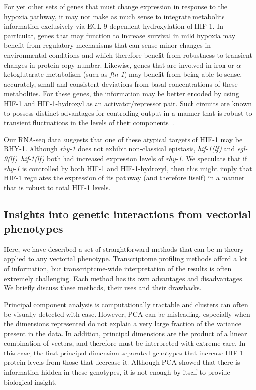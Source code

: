 \documentclass[10pt, onecolumn]{article}
\newcommand{\gene}[1]{\emph{#1}}
\newcommand{\ftna}{\emph{\mbox{ftn-1}}}
\newcommand{\eglhif}{\emph{\mbox{egl-9(lf)}~\mbox{hif-1(lf)}}}
\newcommand{\hif}{\emph{\mbox{hif-1(lf)}}}
\newcommand{\eglp}{EGL-9}
\newcommand{\rhyp}{RHY-1}
\newcommand{\hifp}{HIF-1}
\begin{document}
For yet other sets of genes that must change expression in response to the
hypoxia pathway, it may not make as much sense to integrate metabolite information
exclusively via \eglp{}-dependent hydroxylation of \hifp{}. In particular, genes
that may function to increase survival in mild hypoxia may benefit from
regulatory mechanisms that can sense minor changes in environmental conditions
and which therefore benefit from robustness to transient changes in protein copy
number. Likewise, genes that are involved in iron or $\alpha$-ketoglutarate
metabolism (such as \ftna{}) may benefit from being able to sense, accurately,
small and consistent deviations from basal concentrations of these metabolites.
For these genes, the information may be better encoded by using \hifp{} and
\hifp{}-hydroxyl as an activator/repressor pair. Such circuits are known to
possess distinct advantages for controlling output in a manner that is robust to
transient fluctuations in the levels of their components~\cite{Hart2012,Hart2013}.

Our RNA-seq data suggests that one of these atypical targets of \hifp{} may be
\rhyp{}. Although \gene{rhy-1} does not exhibit non-classical epistasis, \hif{}
and \eglhif{} both had increased expression levels of \gene{rhy-1}. We speculate
that if \gene{rhy-1} is controlled by both \hifp{} and \hifp{}-hydroxyl, then
this might imply that \hifp{} regulates the expression of its pathway (and
therefore itself) in a manner that is robust to total \hifp{} levels.

\subsection*{Insights into genetic interactions from vectorial phenotypes}
Here, we have described a set of straightforward methods that can be in theory
applied to any vectorial phenotype. Transcriptome profiling methods afford a lot
of information, but transcriptome-wide interpretation of the results is often
extremely challenging. Each method has its own advantages and disadvantages. We
briefly discuss these methods, their uses and their drawbacks.

Principal component analysis is computationally tractable and clusters can often
be visually detected with ease. However, PCA can be misleading, especially when
the dimensions represented do not explain a very large fraction of the variance
present in the data. In addition, principal dimensions are the product of a
linear combination of vectors, and therefore must be interpreted with extreme
care. In this case, the first principal dimension separated genotypes that
increase \hifp{} protein levels from those that decrease it. Although PCA showed
that there is information hidden in these genotypes, it is not enough by itself
to provide biological insight.
\end{document}
